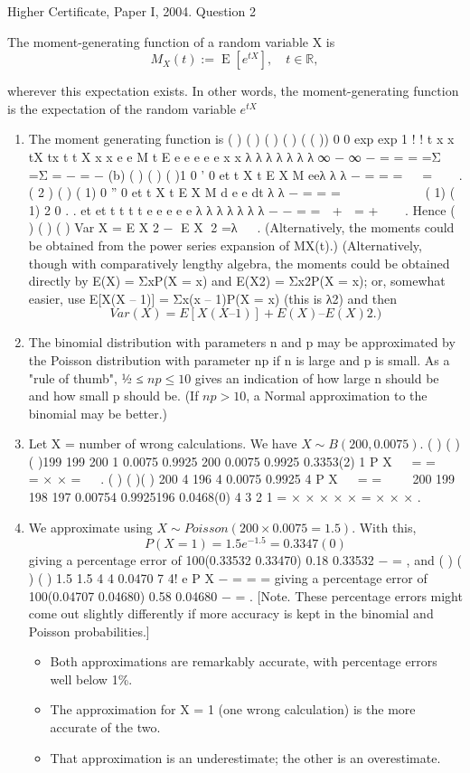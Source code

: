\documentclass[a4paper,12pt]{article}
\begin{document}
Higher Certificate, Paper I, 2004. Question 2


The moment-generating function of a random variable X is 
\[{\displaystyle M_{X}(t):=\operatorname {E} \left[e^{tX}\right],\quad t\in \mathbb {R} ,} \]

wherever this expectation exists. In other words, the moment-generating function is the expectation of the random variable 
${\displaystyle e^{tX}} $
\begin{enumerate}
\item  The moment generating function is
( ) ( ) ( ) ( ) ( ( ))
0 0
exp exp 1
! !
t x x
tX tx t t
X
x x
e e M t E e e e e e
x x
λ
λ λ λ λ λ λ
∞ − ∞
−
= =
= =Σ =Σ = − = −
(b) ( ) ( ) ( )1
0
' 0
et t
X
t
E X M eeλ
λ λ −
=
= =   =  
.
( 2 ) ( ) ( 1)
0
'' 0
et t
X
t
E X M d e e
dt
λ λ −
=
= =         
( 1) ( 1) 2
0
. .
et et t t t
t
e e e e e λ λ λ λ λ λ λ − −
=
=  +  = +  
.
Hence ( ) ( ) ( ) Var X = E X 2 − E X 2 =λ   .
(Alternatively, the moments could be obtained from the power series
expansion of MX(t).)
(Alternatively, though with comparatively lengthy algebra, the
moments could be obtained directly by E(X) = ΣxP(X = x) and E(X2) =
Σx2P(X = x); or, somewhat easier, use E[X(X – 1)] = Σx(x – 1)P(X = x)
(this is λ2) and then 
\[Var(X) = E[X(X – 1)] + E(X) – {E(X)}2.)\]
\item  The binomial distribution with parameters n and p may be
approximated by the Poisson distribution with parameter np if n is
large and p is small. As a "rule of thumb", ½ ≤ $np \leq 10$ gives an
indication of how large n should be and how small p should be. (If
$np > 10$, a Normal approximation to the binomial may be better.)

\item  Let X = number of wrong calculations. We have $X \sim B(200, 0.0075)$.
( ) ( )( )199 199 200
1 0.0075 0.9925 200 0.0075 0.9925 0.3353(2)
1
P X
 
= =   = × × =
 
.
( ) ( )( ) 200 4 196
4 0.0075 0.9925
4
P X
 
= = 
 
200 199 198 197 0.00754 0.9925196 0.0468(0)
4 3 2 1
= × × × × × =
× × ×
.
\item  We approximate using $X \sim Poisson(200 × 0.0075 = 1.5)$. With this,
\[P( X =1) =1.5e^{−1.5} = 0.3347(0)\]
giving a percentage error of 100(0.33532 0.33470)
0.18%
0.33532
−
= , and
( ) ( ) ( )
1.5 1.5 4
4 0.0470 7
4!
e
P X
−
= = =
giving a percentage error of 100(0.04707 0.04680)
0.58%
0.04680
−
= .
[Note. These percentage errors might come out slightly differently if more
accuracy is kept in the binomial and Poisson probabilities.]
\begin{itemize}
    \item Both approximations are remarkably accurate, with percentage errors well
below 1\%. 
\item The approximation for X = 1 (one wrong calculation) is the more
accurate of the two. 
\item That approximation is an underestimate; the other is an
overestimate.
\end{itemize}

\end{enumerate}
\end{document}
